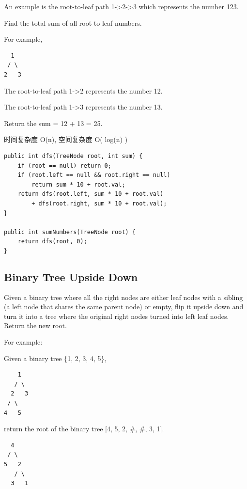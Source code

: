 \documentclass[12pt]{book}
\begin{document}
An example is the root-to-leaf path 1->2->3 which represents the number 123.

Find the total sum of all root-to-leaf numbers.

For example,
\lstset{language=java,label= ,caption= ,numbers=none}
\begin{lstlisting}
  1
 / \
2   3
\end{lstlisting}

The root-to-leaf path 1->2 represents the number 12.

The root-to-leaf path 1->3 represents the number 13.

Return the sum = 12 + 13 = 25.

时间复杂度 O(n), 空间复杂度 O( log(n) )

\lstset{language=java,label= ,caption= ,numbers=none}
\begin{lstlisting}
public int dfs(TreeNode root, int sum) {
    if (root == null) return 0;
    if (root.left == null && root.right == null)
        return sum * 10 + root.val;
    return dfs(root.left, sum * 10 + root.val)
        + dfs(root.right, sum * 10 + root.val);
}

public int sumNumbers(TreeNode root) {
    return dfs(root, 0);
}
\end{lstlisting}

\subsection{Binary Tree Upside Down}
\label{sec-4-5-7}
Given a binary tree where all the right nodes are either leaf nodes with a sibling (a left node that shares the same parent node) or empty, flip it upside down and turn it into a tree where the original right nodes turned into left leaf nodes. Return the new root.

For example:

Given a binary tree \{1, 2, 3, 4, 5\},
\lstset{language=java,label= ,caption= ,numbers=none}
\begin{lstlisting}
    1
   / \
  2   3
 / \
4   5
\end{lstlisting}

return the root of the binary tree [4, 5, 2, \#, \#, 3, 1].
\lstset{language=java,label= ,caption= ,numbers=none}
\begin{lstlisting}
  4
 / \
5   2
   / \
  3   1
\end{lstlisting}
\end{document}
